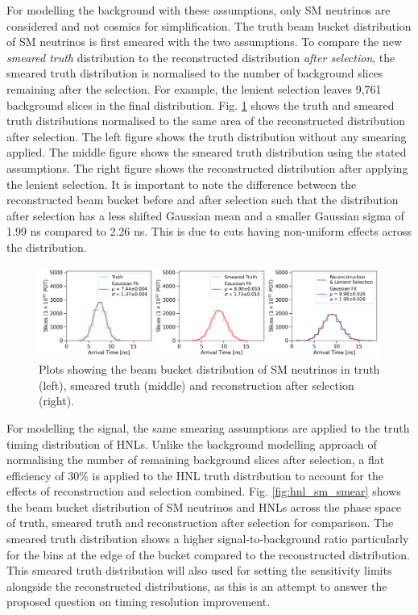 For modelling the background with these assumptions, only SM neutrinos are considered and not cosmics for simplification. 
The truth beam bucket distribution of SM neutrinos is first smeared with the two assumptions.
To compare the new \textit{smeared truth} distribution to the reconstructed distribution \textit{after selection}, the smeared truth distribution is normalised to the number of background slices remaining after the selection.
For example, the lenient selection leaves 9,761 background slices in the final distribution. 
Fig. \ref{fig:gaus_truth_smear} shows the truth and smeared truth distributions normalised to the same area of the reconstructed distribution after selection. 
The left figure shows the truth distribution without any smearing applied.
The middle figure shows the smeared truth distribution using the stated assumptions.
The right figure shows the reconstructed distribution after applying the lenient selection.
It is important to note the difference between the reconstructed beam bucket before and after selection such that the distribution after selection has a less shifted Gaussian mean and a smaller Gaussian sigma of 1.99 ns compared to 2.26 ns.
This is due to cuts having non-uniform effects across the distribution. 

\begin{figure}[ht!]
    \centering
    \includegraphics[width=\textwidth]{truth_smear_reco_gaus.png}
    \caption{Plots showing the beam bucket distribution of SM neutrinos in truth (left), smeared truth (middle) and reconstruction after selection (right).}
    \label{fig:gaus_truth_smear}
\end{figure}

For modelling the signal, the same smearing assumptions are applied to the truth timing distribution of HNLs. 
Unlike the background modelling approach of normalising the number of remaining background slices after selection, a flat efficiency of 30\% is applied to the HNL truth distribution to account for the effects of reconstruction and selection combined.
Fig. \ref{fig:hnl_sm_smear} shows the beam bucket distribution of SM neutrinos and HNLs across the phase space of truth, smeared truth and reconstruction after selection for comparison. 
The smeared truth distribution shows a higher signal-to-background ratio particularly for the bins at the edge of the bucket compared to the reconstructed distribution.
This smeared truth distribution will also used for setting the sensitivity limits alongside the reconstructed distributions, as this is an attempt to answer the proposed question on timing resolution improvement.


